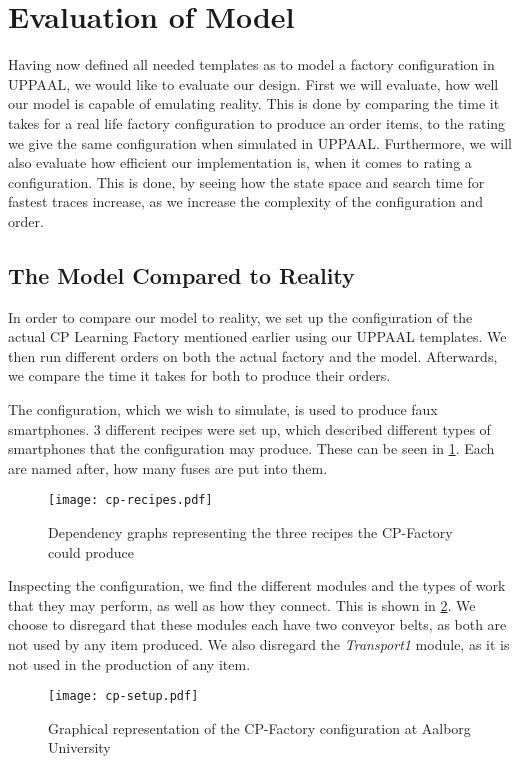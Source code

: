 \section{Evaluation of Model}
Having now defined all needed templates as to model a factory configuration in UPPAAL, we would like to evaluate our design. First we will evaluate, how well our model is capable of emulating reality. This is done by comparing the time it takes for a real life factory configuration to produce an order items, to the rating we give the same configuration when simulated in UPPAAL. Furthermore, we will also evaluate how efficient our implementation is, when it comes to rating a configuration. This is done, by seeing how the state space and search time for fastest traces increase, as we increase the complexity of the configuration and order. 

\subsection{The Model Compared to Reality} 
In order to compare our model to reality, we set up the configuration of the actual CP Learning Factory mentioned earlier using our UPPAAL templates. We then run different orders on both the actual factory and the model. Afterwards, we compare the time it takes for both to produce their orders.  

The configuration, which we wish to simulate, is used to produce faux smartphones. 3 different recipes were set up, which described different types of smartphones that the configuration may produce. These can be seen in \cref{fig:cp-recipes}. Each are named after, how many fuses are put into them.

\begin{figure}[h]
\centering
\texttt{[image: cp-recipes.pdf]}
\caption{Dependency graphs representing the three recipes the CP-Factory could produce}
\label{fig:cp-recipes}
\end{figure}

Inspecting the configuration, we find the different modules and the types of work that they may perform, as well as how they connect. This is shown in \cref{fig:cp-setup}. We choose to disregard that these modules each have two conveyor belts, as both are not used by any item produced. We also disregard the \textit{Transport1} module, as it is not used in the production of any item.

\begin{figure}[h]
\centering
\texttt{[image: cp-setup.pdf]}
\caption{Graphical representation of the CP-Factory configuration at Aalborg University}
\label{fig:cp-setup}
\end{figure}

